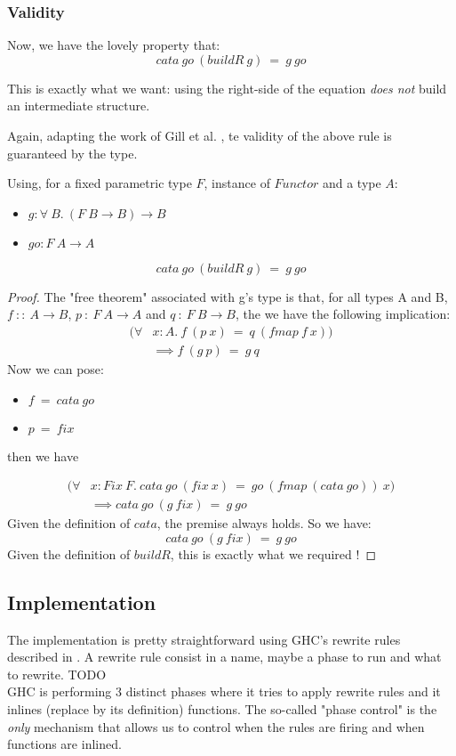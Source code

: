 \subsubsection{Validity}
Now, we have the lovely property that:
$$cata\ go\ (buildR\ g)\ =\ g\ go$$

This is exactly what we want: using the right-side of the equation \emph{does not} build an intermediate structure.

Again, adapting the work of Gill et al. \cite{Gill:1993:SCD:165180.165214}, te validity of the above rule is guaranteed by the type.

\begin{theorem}
Using, for a fixed parametric type $F$, instance of $Functor$ and a type $A$:
\begin{itemize}
	\item $g : \forall\ B.\ (F\ B \to B) \to B$
	\item $go : F\ A \to A $
\end{itemize}
$$cata\ go\ (buildR\ g)\ =\ g\ go$$
\end{theorem}
\begin{proof}
The "free theorem" associated with g's type is that, for all types A and B, $f\ ::\ A \to B$, $p\ :\ F\ A \to A$ and $q\ :\ F\ B \to B$, the we have the following implication:
\begin{align*}
(\forall& x:A.\ f\ (p\ x)\ =\ q\ (fmap\ f\ x))\\
&\implies f\ (g\ p)\ =\ g\ q
\end{align*}
Now we can pose:
\begin{itemize}
	\item $f\ =\ cata\ go$
	\item $p\ =\ fix$
\end{itemize}
then we have

\begin{align*}
(\forall & x:Fix\ F.\ cata\ go\ (fix\ x)\ =\ go\ (fmap\ (cata\ go))\ x)\\
&\implies cata\ go\ (g\ fix)\ =\ g\ go
\end{align*}
Given the definition of $cata$, the premise always holds. So we have:
$$cata\ go\ (g\ fix)\ =\ g\ go$$
Given the definition of $buildR$, this is exactly what we required !
\end{proof}
\subsection{Implementation}
The implementation is pretty straightforward using GHC's rewrite rules described in \cite{pbr}. A rewrite rule consist in a name, maybe a phase to run and what to rewrite. TODO\\
GHC is performing 3 distinct phases where it tries to apply rewrite rules and it inlines (replace by its definition) functions. The so-called "phase control" is the \emph{only} mechanism that allows us to control when the rules are firing and when functions are inlined.

